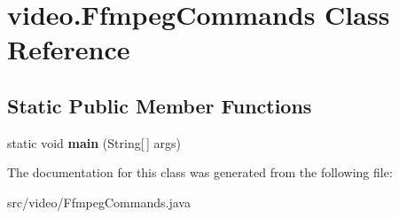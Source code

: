 \hypertarget{classvideo_1_1_ffmpeg_commands}{
\section{video.FfmpegCommands Class Reference}
\label{classvideo_1_1_ffmpeg_commands}
}
\subsection*{Static Public Member Functions}
\begin{DoxyCompactItemize}
\item 
\hypertarget{classvideo_1_1_ffmpeg_commands_ac1646537a98df0dc44fe670598d09d04}{
static void {\bfseries main} (String\mbox{[}$\,$\mbox{]} args)}
\label{classvideo_1_1_ffmpeg_commands_ac1646537a98df0dc44fe670598d09d04}

\end{DoxyCompactItemize}


The documentation for this class was generated from the following file:\begin{DoxyCompactItemize}
\item 
src/video/FfmpegCommands.java\end{DoxyCompactItemize}
